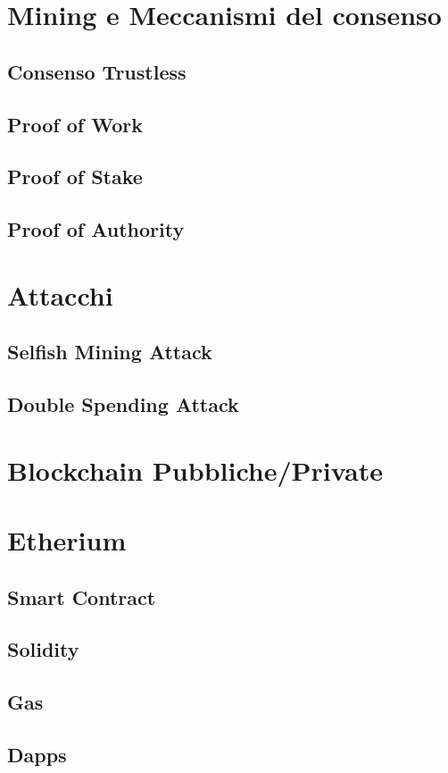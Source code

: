 \documentclass[a4paper]{report}
\begin{document}
\section{Mining e Meccanismi del consenso}
\subsection{Consenso Trustless}
\subsection{Proof of Work}
\subsection{Proof of Stake}
\subsection{Proof of Authority}
\section{Attacchi}
\subsection{Selfish Mining Attack}
\subsection{Double Spending Attack}
\section{Blockchain Pubbliche/Private}
\section{Etherium}
\subsection{Smart Contract}
\subsection{Solidity}
\subsection{Gas}
\subsection{Dapps}
\end{document}
